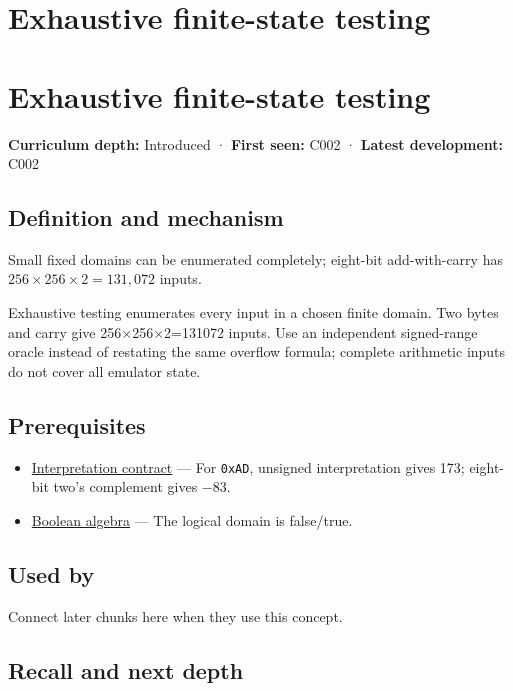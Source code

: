 \hypertarget{appendix-05db24ccc28a}{}
\section*{Exhaustive finite-state testing}
\section{Exhaustive finite-state testing}\label{exhaustive-finite-state-testing}

\textbf{Curriculum depth:} Introduced · \textbf{First seen:} C002 · \textbf{Latest development:} C002

\subsection{Definition and mechanism}\label{definition-and-mechanism}

Small fixed domains can be enumerated completely; eight-bit add-with-carry has \(256\times256\times2=131{,}072\) inputs.

Exhaustive testing enumerates every input in a chosen finite domain. Two bytes and carry give 256×256×2=131072 inputs. Use an independent signed-range oracle instead of restating the same overflow formula; complete arithmetic inputs do not cover all emulator state.

\subsection{Prerequisites}\label{prerequisites}

\begin{itemize}
\tightlist
\item
  \hyperref[appendix-f414bd4ed05c]{Interpretation contract} --- For \texttt{0xAD}, unsigned interpretation gives 173; eight-bit two's complement gives −83.
\item
  \hyperref[appendix-24475e1596a8]{Boolean algebra} --- The logical domain is false/true.
\end{itemize}

\subsection{Used by}\label{used-by}

Connect later chunks here when they use this concept.

\subsection{Recall and next depth}\label{recall-and-next-depth}

